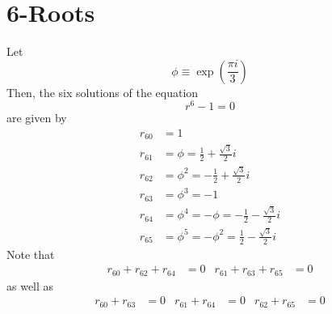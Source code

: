 \section{6-Roots}
Let
\begin{equation}
    \phi \equiv \exp\left( \frac{\pi i}{3} \right)
    \label{eq.2.phi}
\end{equation}
Then, the six solutions of the equation
\begin{equation}
    r^{6} - 1 = 0
\end{equation}
are given by
\begin{align}
    r_{60} &= 1 \label{eq.2.r60} \\
    r_{61} &= \phi = \frac{1}{2} + \frac{\sqrt{3}}{2}i \label{eq.2.r61} \\
    r_{62} &= \phi^{2} = -\frac{1}{2} + \frac{\sqrt{3}}{2}i \label{eq.2.r62} \\
    r_{63} &= \phi^{3} = -1 \\
    r_{64} &= \phi^{4} = -\phi = -\frac{1}{2} - \frac{\sqrt{3}}{2}i \label{eq.2.r64} \\
    r_{65} &= \phi^{5} = -\phi^{2} = \frac{1}{2} - \frac{\sqrt{3}}{2}i
\end{align}
Note that
\begin{align}
    r_{60} + r_{62} + r_{64} &= 0 & r_{61} + r_{63} + r_{65} &= 0
\end{align}
as well as
\begin{align}
    r_{60} + r_{63} &= 0 & r_{61} + r_{64} &= 0 & r_{62} + r_{65} &= 0
\end{align}
